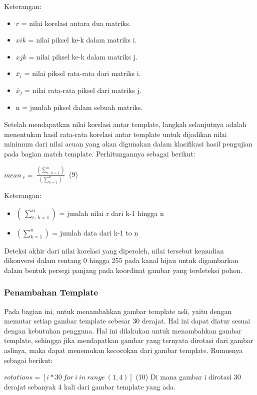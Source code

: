 \begin{enumerate}
	Keterangan:
	\begin{itemize}
		\item 	$r$ = nilai korelasi antara dua matriks.
		\item $xik$ = nilai piksel ke-k dalam matriks i.
		\item $xjk$ = nilai piksel ke-k dalam matriks j.
		\item ${\bar{x}}_i$ = nilai piksel rata-rata dari matriks i.
		\item ${\bar{x}}_j$ = nilai rata-rata piksel dari matriks j.
		\item n = jumlah piksel dalam sebuah matriks.
	\end{itemize}
	Setelah mendapatkan nilai korelasi antar template, langkah selanjutnya adalah menentukan hasil rata-rata korelasi antar template untuk dijadikan nilai minimum dari nilai acuan yang akan digunakan dalam klasifikasi hasil pengujian pada bagian match template. Perhitungannya sebagai berikut:
	
	${mean\ }_r=\ \frac{(\sum_{r,\ k=1}^{n})}{(\sum_{k=1}^{n})}\ $ \hfill (9)
	
	Keterangan:
	\begin{itemize}
		\item $(\ \sum_{r,\ k=1}^{n})$ = jumlah nilai r dari k-1 hingga n
		
		\item $(\sum_{k=1}^{n})$ = jumlah data dari k-1 to n
	\end{itemize}
	
	Deteksi akhir dari nilai korelasi yang diperoleh, nilai tersebut kemudian dikonversi dalam rentang 0 hingga 255 pada kanal hijau untuk digambarkan dalam bentuk persegi panjang pada koordinat gambar yang terdeteksi pohon.
	
\end{enumerate}

\subsubsection{Penambahan Template}
\hspace{1,2cm}Pada bagian ini, untuk menambahkan gambar template asli, yaitu dengan memutar setiap gambar template sebesar 30 derajat. Hal ini dapat diatur sesuai dengan kebutuhan pengguna. Hal ini dilakukan untuk menambahkan gambar template, sehingga jika mendapatkan gambar yang ternyata dirotasi dari gambar aslinya, maka dapat menemukan kecocokan dari gambar template. Rumusnya sebagai berikut:

$rotations=[i\ast30\ for\ i\ in\ range\ \left(1,4\right)]$ \hfill (10)
Di mana gambar i dirotasi 30 derajat sebanyak 4 kali dari gambar template yang ada.

